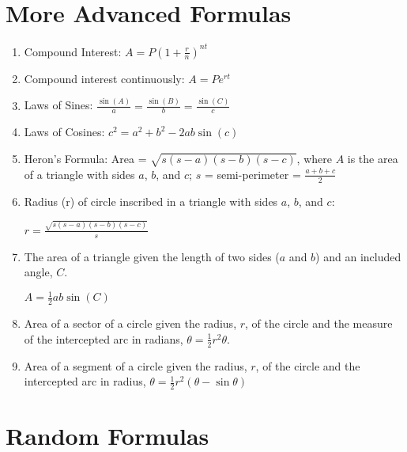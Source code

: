 \documentclass[../uilmath.tex]{subfiles}
\begin{document}
\section*{More Advanced Formulas}
\begin{enumerate}
    \item Compound Interest: $A = P\left(1+\frac{r}{n}\right)^{nt}$
    \item Compound interest continuously: $A = Pe^{rt}$
    \item Laws of Sines: $\frac{\sin (A)}{a} = \frac{\sin(B)}{b} = \frac{\sin(C)}{c}$
    \item Laws of Cosines: $c^2=a^2+b^2-2ab \sin(c)$
    \item Heron's Formula: Area = $\sqrt{s(s-a)(s-b)(s-c)}$, where $A$ is the area of a triangle with sides $a$, $b$, and $c$; $s$ = semi-perimeter = $\frac{a+b+c}{2}$
    \item Radius (r) of circle inscribed in a triangle with sides $a$, $b$, and $c$:
    
    $r=\frac{\sqrt{s(s-a)(s-b)(s-c)}}{s}$

    \item The area of a triangle given the length of two sides ($a$ and $b$) and an included angle, $C$.
    
    $A = \frac{1}{2}ab\sin(C)$

    \item Area of a sector of a circle given the radius, $r$, of the circle and the measure of the intercepted arc in radians, $\theta = \frac{1}{2}r^2\theta$.
    \item Area of a segment of a circle given the radius, $r$, of the circle and the intercepted arc in radius, $\theta = \frac{1}{2}r^2(\theta - \sin\theta)$
\end{enumerate}

\section*{Random Formulas}
\end{document}
